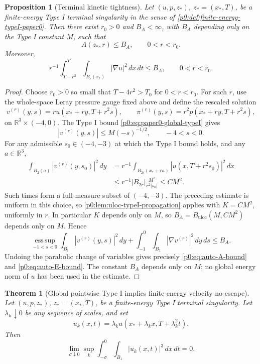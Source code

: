 \documentclass[11pt]{amsart}
\theoremstyle{plain}
\newtheorem{theorem}{Theorem}[section]
\newtheorem{proposition}[proposition]{Proposition}
\theoremstyle{definition}
\theoremstyle{remark}
\numberwithin{equation}{section}
\begin{document}
\begin{proposition}[Terminal kinetic tightness]
\label{p0:prop:auto-terminal-A}
Let \((u,p,z_*)\), \(z_*=(x_*,T)\), be a finite-energy Type I terminal
singularity in the sense of \cref{p0:def:finite-energy-typeI-paper0}.  Then there
exist \(r_0>0\) and \(B_A<\infty\), with \(B_A\) depending only on the Type I
constant \(M\), such that
\begin{equation}\label{p0:eq:auto-A-bound}
  A(z_*,r)\le B_A,
  \qquad 0<r<r_0 .
\end{equation}
Moreover,
\begin{equation}\label{p0:eq:auto-E-bound}
  r^{-1}\int_{T-r^2}^{T}\int_{B_r(x_*)}|\nabla u|^2\,dx\,dt
  \le B_A,
  \qquad 0<r<r_0 .
\end{equation}
\end{proposition}

\begin{proof}
Choose \(r_0>0\) so small that \(T-4r^2>T_0\) for \(0<r<r_0\).  For such
\(r\), use the whole-space Leray pressure gauge fixed above and define the
rescaled solution
\[
  v^{(r)}(y,s)=r u(x_*+ry,T+r^2s),
  \qquad
  \pi^{(r)}(y,s)=r^2 p(x_*+ry,T+r^2s),
\]
on \(\mathbb R^3\times(-4,0)\).  The Type I bound
\eqref{p0:eq:paper0-global-typeI} gives
\[
  |v^{(r)}(y,s)|\le M(-s)^{-1/2},
  \qquad -4<s<0 .
\]
For any admissible \(s_0\in(-4,-3)\) at which the Type I bound holds, and any
\(a\in\mathbb R^3\),
\begin{align*}
  \int_{B_2(a)} |v^{(r)}(y,s_0)|^2\,dy
  &= r^{-1}\int_{B_{2r}(x_*+ra)}
       |u(x,T+r^2s_0)|^2\,dx                                    \\
  &\le r^{-1}|B_{2r}|\frac{M^2}{r^2|s_0|}
   \le C M^2 .
\end{align*}
Such times form a full-measure subset of \((-4,-3)\).  The preceding estimate
is uniform in this choice, so \cref{p0:lem:uloc-typeI-propagation} applies with
\(K=CM^2\), uniformly in \(r\).  In particular \(K\) depends only on \(M\),
so \(B_A=B_{\mathrm{uloc}}(M,CM^2)\) depends only on \(M\).  Hence
\[
  \operatorname*{ess\,sup}_{-1<s<0}\int_{B_1}|v^{(r)}(y,s)|^2\,dy
  +\int_{-1}^{0}\int_{B_1}|\nabla v^{(r)}|^2\,dy\,ds
  \le B_A .
\]
Undoing the parabolic change of variables gives precisely
\eqref{p0:eq:auto-A-bound} and \eqref{p0:eq:auto-E-bound}.  The constant \(B_A\)
depends only on \(M\); no global energy norm of \(u\) has been used in the
estimate.
\end{proof}

\begin{theorem}[Global pointwise Type I implies finite-energy velocity no-escape]
\label{p0:thm:auto-velocity-no-escape}
Let \((u,p,z_*)\), \(z_*=(x_*,T)\), be a finite-energy Type I terminal
singularity.  Let \(\lambda_k\downarrow0\) be any sequence of scales, and set
\[
  u_k(x,t)=\lambda_k u(x_*+\lambda_k x,T+\lambda_k^2 t).
\]
Then
\begin{equation}\label{p0:eq:auto-no-escape}
  \lim_{\sigma\downarrow0}
  \sup_k\int_{-\sigma}^{0}\int_{B_1}|u_k(x,t)|^3\,dx\,dt=0 .
\end{equation}
\end{theorem}
\end{document}
